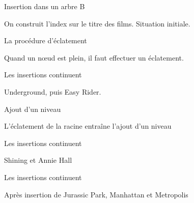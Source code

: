 \begin{frame}{Insertion dans un arbre B}

On construit l'index sur le titre des films. Situation initiale.

\vfill


\end{frame}

\begin{frame}{La procédure d'éclatement}


\vfill
\begin{blocgauche}
Quand un n{\oe}ud est plein, il faut effectuer un \alert{éclatement}.
\end{blocgauche}
\end{frame}

\begin{frame}{Les insertions continuent}


\vfill
\begin{blocgauche}
Underground, puis Easy Rider.
\end{blocgauche}
\end{frame}



\begin{frame}{Ajout d'un niveau}


\vfill
\begin{blocgauche}
L'éclatement de la racine entraîne l'ajout d'un niveau
\end{blocgauche}
\end{frame}

\begin{frame}{Les insertions continuent}


\vfill
\begin{blocgauche}
Shining et Annie Hall
\end{blocgauche}
\end{frame}

\begin{frame}{Les insertions continuent}


\vfill
\begin{blocgauche}
Après insertion de Jurassic Park, 
Manhattan et Metropolis
\end{blocgauche}
\end{frame}

